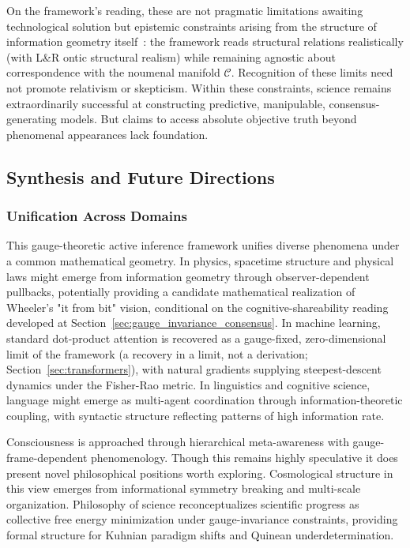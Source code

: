 \documentclass[11pt]{article}
\begin{document}
On the framework's reading, these are not pragmatic limitations awaiting technological solution but epistemic constraints arising from the structure of information geometry itself~\cite{Ladyman2007}: the framework reads structural relations realistically (with L\&R ontic structural realism) while remaining agnostic about correspondence with the noumenal manifold $\mathcal{C}$. Recognition of these limits need not promote relativism or skepticism. Within these constraints, science remains extraordinarily successful at constructing predictive, manipulable, consensus-generating models. But claims to access absolute objective truth beyond phenomenal appearances lack foundation.

\subsection{Synthesis and Future Directions}

\subsubsection{Unification Across Domains}

This gauge-theoretic active inference framework unifies diverse phenomena under a common mathematical geometry. In physics, spacetime structure and physical laws might emerge from information geometry through observer-dependent pullbacks, potentially providing a candidate mathematical realization of Wheeler's "it from bit" vision, conditional on the cognitive-shareability reading developed at Section~\ref{sec:gauge_invariance_consensus}. In machine learning, standard dot-product attention is recovered as a gauge-fixed, zero-dimensional limit of the framework (a recovery in a limit, not a derivation; Section~\ref{sec:transformers}), with natural gradients supplying steepest-descent dynamics under the Fisher-Rao metric. In linguistics and cognitive science, language might emerge as multi-agent coordination through information-theoretic coupling, with syntactic structure reflecting patterns of high information rate.

Consciousness is approached through hierarchical meta-awareness with gauge-frame-dependent phenomenology. Though this remains highly speculative it does present novel philosophical positions worth exploring. Cosmological structure in this view emerges from informational symmetry breaking and multi-scale organization. Philosophy of science reconceptualizes scientific progress as collective free energy minimization under gauge-invariance constraints, providing formal structure for Kuhnian paradigm shifts and Quinean underdetermination.
\end{document}
